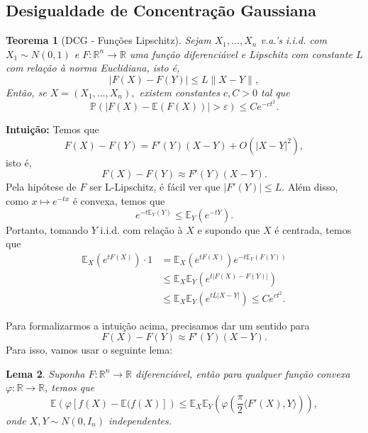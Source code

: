 \documentclass[12pt,a4paper,oneside]{book}
\newtheorem{theorem}{Teorema}[section]
\newtheorem{lemma}[theorem]{Lema}
\theoremstyle{definition}
\theoremstyle{remark}
\numberwithin{equation}{section}
\newcommand{\R}{\mathbb{R}}
\newcommand{\e}{\varepsilon}
\newcommand{\E}{\mathbb{E}}
\newcommand{\pr}{\mathbb{P}}
\begin{document}
\subsection{Desigualdade de Concentração Gaussiana } 
\begin{theorem}[DCG - Funções Lipschitz]\label{des-conc-gauss-lipsc}
Sejam $X_1,\dots, X_n$ v.a.'s i.i.d. com $X_1\sim N(0,1)$ e $F:\R^n\rightarrow \R$ uma função diferenciável e Lipschitz com constante $L$ com relação à norma Euclidiana, isto é,
$$|F(X)-F(Y)|\leq L\|X-Y\|, $$  
Então, se $X= (X_1,\dots,X_n),$ existem constantes $c,C>0$ tal que
$$ \pr(|F(X)-\E(F(X))|>\e)\leq Ce^{-ct^2}.$$
\end{theorem}

\begin{tcolorbox}[colback = yellow!60]

\textbf{Intuição:} Temos que 
$$F(X)-F(Y) = F'(Y)(X-Y) + O(|X-Y|^2), $$
isto é,
$$F(X)-F(Y) \approx F'(Y)(X-Y). $$
Pela hipótese de $F$ ser L-Lipschitz, é fácil ver que $|F'(Y)|\leq L$. Além disso, como $x\mapsto e^{-tx}$ é convexa, temos que
$$e^{-t\E_Y(Y)}\leq\E_Y(e^{-tY}). $$
Portanto, tomando $Y$ i.i.d. com relação à $X$ e supondo que $X$ é centrada, temos que
\begin{align*}
\E_X(e^{tF(X)})\cdot 1 & = \E_X(e^{tF(X)})e^{-t\E_Y(F(Y))}\\
&\leq \E_X\E_Y(e^{t|F(X)-F(Y)|})\\
&\leq \E_X\E_Y(e^{tL|X-Y|})\leq Ce^{ct^2}.
\end{align*}

\end{tcolorbox}

Para formalizarmos a intuição acima, precisamos dar um sentido para
$$F(X)-F(Y) \approx F'(Y)(X-Y). $$
Para isso, vamos usar o seguinte lema:

\begin{lemma}\label{lema-gaussian-derivative-phi}
Suponha $F:\R^n \rightarrow \R$ diferenciável, então para qualquer função convexa $\varphi:\R \rightarrow \R$, temos que
$$\E\left(  \varphi[    f(X)-\E(f(X)      ]  \right) \leq \E_X\E_Y \left(\varphi\left( \dfrac{\pi}{2}\langle F'(X),Y\rangle\right) \right), $$
onde $X,Y\sim N(0,I_n)$ independentes.
\end{lemma}
\end{document}
